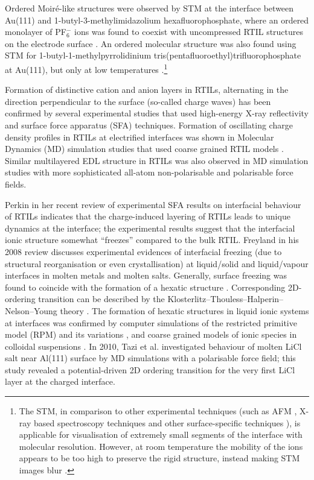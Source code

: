 \documentclass[final,5p,times,twocolumn]{elsarticle}
\begin{document}
Ordered Moir{\'e}-like structures were  observed by STM at the interface between Au(111) and 1-butyl-3-methylimidazolium hexafluorophosphate, where an ordered monolayer of PF$_6^-$ ions was found to coexist with uncompressed RTIL structures on the electrode surface \cite{Pan2006}. An ordered molecular structure was also found using STM for 1-butyl-1-methylpyrrolidinium tris(pentafluoro\-ethyl)trifluorophosphate at Au(111), but only at low temperatures \cite{Waldmann2011}.\footnote{ The STM, in comparison to other experimental techniques (such as AFM \cite{Hayes2011,Carstens2012}, X-ray based spectroscopy techniques \cite{Zhou2012,Lauw2012,Tamam2011,Tamura2011,Cremer2011} and other surface-specific techniques \cite{Foulston2012,Penalber2012,Baldelli2013}), is applicable for visualisation of extremely small segments of the interface with molecular resolution. However, at room temperature the mobility of the ions appears to be too high to preserve the rigid structure, instead making STM images blur \cite{Carstens2012,Borisenko2012,Atkin2009}.}

Formation of distinctive cation and anion layers in RTILs, alternating in the direction perpendicular to the surface (so-called charge waves) has been confirmed by several experimental studies that used high-energy X-ray reflectivity \cite{Mezger2008,Zhou2012} and surface force apparatus (SFA) \cite{Perkin2012} techniques. Formation of oscillating charge density profiles in RTILs at electrified interfaces was shown in Molecular Dynamics (MD) simulation studies that used coarse grained RTIL models \cite{Fedorov2008,Fedorov2008a,Fedorov2010}. Similar multilayered EDL structure in RTILs was also observed in MD simulation studies with more sophisticated all-atom non-polarisable \cite{Pinilla2005,Lynden-Bell2012} and polarisable \cite{Vatamanu2010,Vatamanu2011} force fields.

Perkin in her recent review of experimental SFA results on interfacial behaviour of RTILs \cite{Perkin2012} indicates that the charge-induced layering of RTILs leads to unique dynamics at the interface; the  experimental results suggest that the interfacial ionic structure somewhat ``freezes'' compared to the bulk RTIL. Freyland in his 2008 review \cite{Freyland2008} discusses experimental evidences of interfacial freezing (due to structural reorganisation or even crystallisation) at liquid/solid and liquid/vapour interfaces in molten metals and molten salts. Generally, surface freezing was found to coincide with the formation of a hexatic structure \cite{Freyland2008}. Corresponding 2D-ordering transition can be described by the Klosterlitz--Thouless--Halperin--Nelson--Young theory \cite{Strandburg1988}. The formation of hexatic structures in liquid ionic systems at interfaces was confirmed by computer simulations of the restricted primitive model (RPM) and its variations \cite{Strandburg1988,Boda1998,Marzec2007,Hynninen2008,Gribova2011,Schroer2012}, and coarse grained models of ionic species in colloidal suspensions \cite{Grandner2010,Klapp2010}. In 2010, Tazi et al. \cite{Tazi2010} investigated behaviour of molten LiCl salt near Al(111) surface by MD simulations with a polarisable force field; this study revealed a potential-driven 2D ordering transition for the very first LiCl layer at the charged interface.
\end{document}
